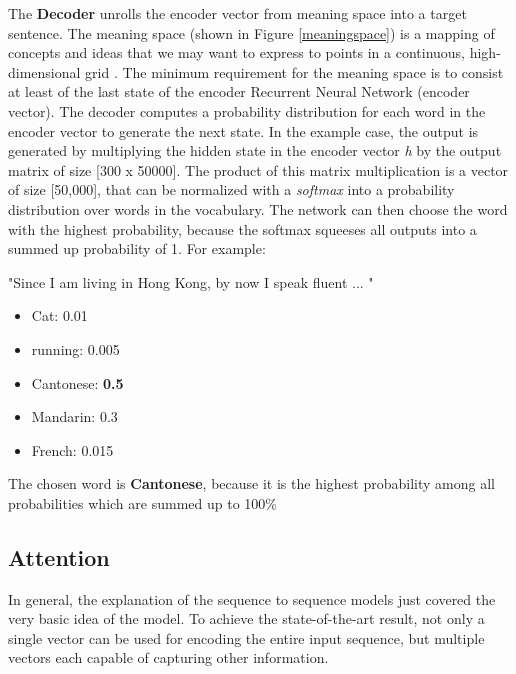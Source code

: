 The \textbf{Decoder} unrolls the encoder vector from meaning space into a target sentence. The meaning space (shown in Figure \ref{meaningspace}) is a mapping of concepts and ideas that we may want to express to points in a continuous, high-dimensional grid \cite{mugan}. 
The minimum requirement for the meaning space is to consist at least of the last state of the encoder Recurrent Neural Network (encoder vector). The decoder computes a probability distribution for each word in the encoder vector to generate the next state. In the example case, the output is generated by multiplying the hidden state in the encoder vector \textit{h} by the output matrix of size [300 x 50000]. The product of this matrix multiplication is a vector of size [50,000], that can be normalized with a \textit{softmax} into a probability distribution over words in the vocabulary. The network can then choose the word with the highest probability, because the softmax squeeses all outputs into a summed up probability of 1. For example:

\begin{tcolorbox}
	"Since I am living in Hong Kong, by now I speak fluent ... "
	
	\begin{itemize}
		\item Cat: 0.01
		\item running: 0.005
		\item Cantonese: \textbf{0.5}
		\item Mandarin: 0.3
		\item French: 0.015
	\end{itemize}

	The chosen word is \textbf{Cantonese}, because it is the highest probability among all probabilities which are summed up to 100\%
\end{tcolorbox}
 

\subsection{Attention}\label{ss:atten}
In general, the explanation of the sequence to sequence models just covered the very basic idea of the model. To achieve the state-of-the-art result, not only a single vector can be used for encoding the entire input sequence, but multiple vectors each capable of capturing other information. 

